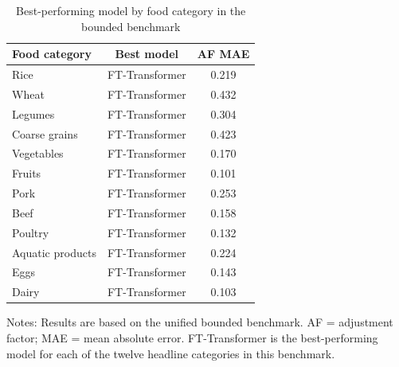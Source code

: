 \documentclass[preprint,12pt,authoryear]{elsarticle}
\begin{document}
\begin{table}[htbp]
\centering
\begin{threeparttable}
\caption{Best-performing model by food category in the bounded benchmark}
\label{tab:best_by_cat}
\small
\setlength{\tabcolsep}{0pt}
\begin{tabular*}{\textwidth}{@{\extracolsep{\fill}} lcc @{}}
\toprule
Food category & Best model & AF MAE \\
\midrule
Rice             & FT-Transformer & 0.219 \\
Wheat            & FT-Transformer & 0.432 \\
Legumes          & FT-Transformer & 0.304 \\
Coarse grains    & FT-Transformer & 0.423 \\
Vegetables       & FT-Transformer & 0.170 \\
Fruits           & FT-Transformer & 0.101 \\
Pork             & FT-Transformer & 0.253 \\
Beef             & FT-Transformer & 0.158 \\
Poultry          & FT-Transformer & 0.132 \\
Aquatic products & FT-Transformer & 0.224 \\
Eggs             & FT-Transformer & 0.143 \\
Dairy            & FT-Transformer & 0.103 \\
\bottomrule
\end{tabular*}
\begin{tablenotes}[flushleft]
\scriptsize
\item Notes: Results are based on the unified bounded benchmark. AF = adjustment factor; MAE = mean absolute error. FT-Transformer is the best-performing model for each of the twelve headline categories in this benchmark.
\end{tablenotes}
\end{threeparttable}
\end{table}
\end{document}
